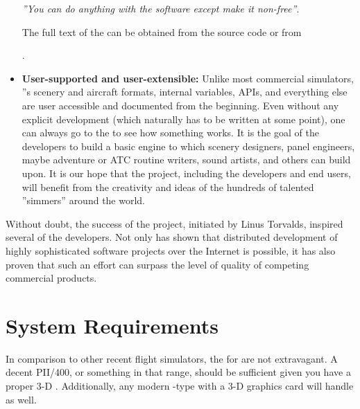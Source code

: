 \begin{itemize}
\centerline{\textit{''You can do anything with the software except make it non-free''}.}

The full text of the  can be obtained from the \FlightGear{} source code or from
 \medskip

.
 \medskip

\item\textbf{User-supported and user-extensible:}
   Unlike most commercial simulators,
  \FlightGear{}''s scenery and aircraft formats, internal variables, APIs, and everything
  else are user accessible and documented from the beginning. Even without any explicit
  development  (which naturally has to be written at some point),
  one can always go to the  to see how something works. It is the
  goal of the developers to build a basic engine to which scenery designers, panel
  engineers, maybe adventure or ATC routine writers, sound artists, and others can build
  upon. It is our hope that the project, including the developers and end users, will
  benefit from the creativity and ideas of the hundreds of talented ''simmers'' around
  the world.
\end{itemize}

  Without doubt, the success of the  project, initiated by Linus
  Torvalds, inspired several of the developers.
  Not only has  shown that distributed development of highly
  sophisticated software projects over the Internet is possible, it has also
  proven that such an effort can surpass the level of quality of competing
  commercial products.


\section{System Requirements}
In comparison to other recent flight simulators, the  for
\FlightGear{} are not extravagant. A decent PII/400, or something in that range, should be
sufficient given you have a proper 3-D . Additionally, any
modern -type  with a 3-D graphics card will handle
\FlightGear{} as well.

